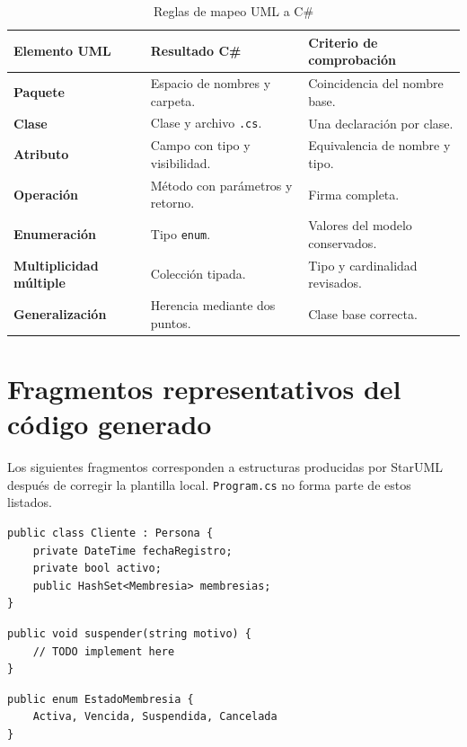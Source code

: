 \documentclass[12pt,a4paper]{article}
\begin{document}
\begin{table}[htbp]
  \centering
  \caption{Reglas de mapeo UML a C\#}
  \footnotesize
  \begin{tabularx}{\textwidth}{>{\bfseries}p{3.5cm}XX}
    \toprule
    Elemento UML & Resultado C\# & Criterio de comprobación \\
    \midrule
    Paquete & Espacio de nombres y carpeta. & Coincidencia del nombre base. \\
    Clase & Clase y archivo \texttt{.cs}. & Una declaración por clase. \\
    Atributo & Campo con tipo y visibilidad. & Equivalencia de nombre y tipo. \\
    Operación & Método con parámetros y retorno. & Firma completa. \\
    Enumeración & Tipo \texttt{enum}. & Valores del modelo conservados. \\
    Multiplicidad múltiple & Colección tipada. & Tipo y cardinalidad revisados. \\
    Generalización & Herencia mediante dos puntos. & Clase base correcta. \\
    \bottomrule
  \end{tabularx}
\end{table}

\section{Fragmentos representativos del código generado}

Los siguientes fragmentos corresponden a estructuras producidas por StarUML
después de corregir la plantilla local. \texttt{Program.cs} no forma parte de
estos listados.

\begin{lstlisting}[style=codigoCSharp,caption={Herencia y colección generadas en Cliente.cs}]
public class Cliente : Persona {
    private DateTime fechaRegistro;
    private bool activo;
    public HashSet<Membresia> membresias;
}
\end{lstlisting}

\begin{lstlisting}[style=codigoCSharp,caption={Operación añadida mediante roundtrip en Membresia.cs}]
public void suspender(string motivo) {
    // TODO implement here
}
\end{lstlisting}

\begin{lstlisting}[style=codigoCSharp,caption={Enumeración generada en EstadoMembresia.cs}]
public enum EstadoMembresia {
    Activa, Vencida, Suspendida, Cancelada
}
\end{lstlisting}
\end{document}
